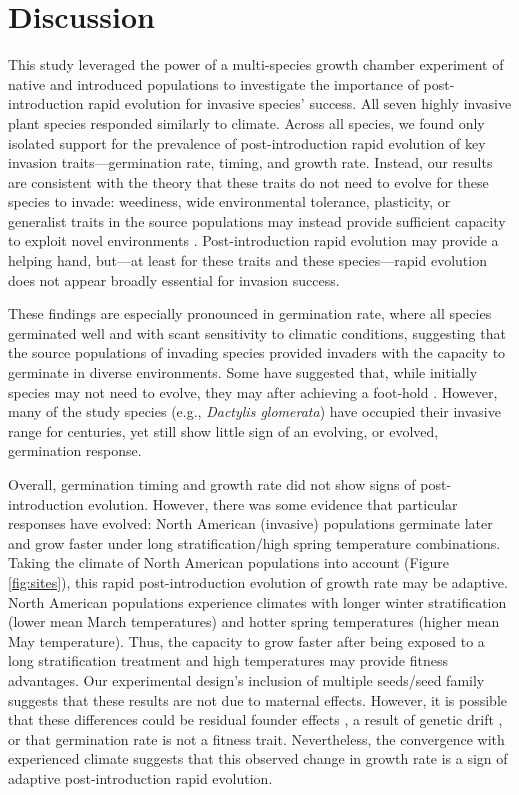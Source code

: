 \documentclass[12pt]{article}\usepackage[]{graphicx}\usepackage[]{color}
\begin{document}
	\section{Discussion}
	
	This study leveraged the power of a multi-species growth chamber experiment of native and introduced populations to investigate the importance of post-introduction rapid evolution for invasive species' success. All seven highly invasive plant species responded similarly to climate. Across all species, we found only isolated support for the prevalence of post-introduction rapid evolution of key invasion traits---germination rate, timing, and growth rate. Instead, our results are consistent with the theory that these traits do not need to evolve for these species to invade: weediness, wide environmental tolerance, plasticity, or generalist traits in the source populations may instead provide sufficient capacity to exploit novel environments \parencite{Baker1965}. Post-introduction rapid evolution may provide a helping hand, but---at least for these traits and these species---rapid evolution does not appear broadly essential for invasion success. %
	
	These findings are especially pronounced in germination rate, where all species germinated well and with scant sensitivity to climatic conditions, suggesting that the source populations of invading species provided invaders with the capacity to germinate in diverse environments. Some have suggested that, while initially species may not need to evolve, they may after achieving a foot-hold \parencite{Lamarque2015}. However, many of the study species (e.g., \textit{Dactylis glomerata}) have occupied their invasive range for centuries, yet still show little sign of an evolving, or evolved, germination response. 
	
	Overall, germination timing and growth rate did not show signs of post-introduction evolution. However, there was some evidence that particular responses have evolved: North American (invasive) populations germinate later and grow faster under long stratification/high spring temperature combinations. Taking the climate of North American populations into account (Figure \ref{fig:sites}), this rapid post-introduction evolution of growth rate may be adaptive. North American populations experience climates with longer winter stratification  (lower mean March temperatures) and hotter spring temperatures (higher mean May temperature). Thus, the capacity to grow faster after being exposed to a long stratification treatment and high temperatures may provide fitness advantages. Our experimental design's inclusion of multiple seeds/seed family suggests that these results are not due to maternal effects. However, it is  possible that these differences could be residual founder effects \parencite{Shirk2014}, a result of genetic drift \parencite{Eckert1996}, or that germination rate is not a fitness trait. Nevertheless, the convergence with experienced climate suggests that this observed change in growth rate is a sign of adaptive post-introduction rapid evolution. 
	
\end{document}
